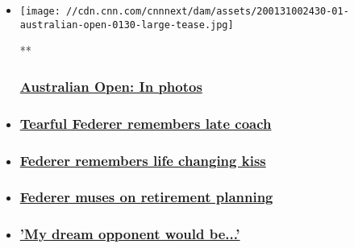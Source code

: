 \begin{itemize}
\item
  \href{/2020/01/22/sport/gallery/australian-open-tennis-2020-spt-intl/index.html}{}

  \texttt{[image: //cdn.cnn.com/cnnnext/dam/assets/200131002430-01-australian-open-0130-large-tease.jpg]}

  **

  \hypertarget{australian-open-in-photos}{%
  \subsubsection{\texorpdfstring{\href{/2020/01/22/sport/gallery/australian-open-tennis-2020-spt-intl/index.html}{Australian
  Open: In
  photos}}{Australian Open: In photos}}\label{australian-open-in-photos}}
\item
  \hypertarget{tearful-federer-remembers-late-coach}{%
  \subsubsection{\texorpdfstring{\href{/videos/sports/2019/01/07/exp-roger-federer-interview-australian-open-peter-carter-spt-intl.cnn}{Tearful
  Federer remembers late
  coach}}{Tearful Federer remembers late coach}}\label{tearful-federer-remembers-late-coach}}
\item
  \hypertarget{federer-remembers-life-changing-kiss}{%
  \subsubsection{\texorpdfstring{\href{/videos/sports/2019/01/08/roger-federer-revealed-family-man-tennis-spt-intl.cnn}{Federer
  remembers life changing
  kiss}}{Federer remembers life changing kiss}}\label{federer-remembers-life-changing-kiss}}
\item
  \hypertarget{federer-muses-on-retirement-planning}{%
  \subsubsection{\texorpdfstring{\href{/videos/sports/2019/01/11/roger-federer-r-word-retirement-tennis-world-sport-spt-intl.cnn}{Federer
  muses on retirement
  planning}}{Federer muses on retirement planning}}\label{federer-muses-on-retirement-planning}}
\item
  \hypertarget{my-dream-opponent-would-be}{%
  \subsubsection{\texorpdfstring{\href{/videos/sports/2019/01/10/roger-federer-bjorn-borg-wimbledon-tennis-world-sport.cnn}{'My
  dream opponent would
  be...'}}{'My dream opponent would be...'}}\label{my-dream-opponent-would-be}}
\end{itemize}

